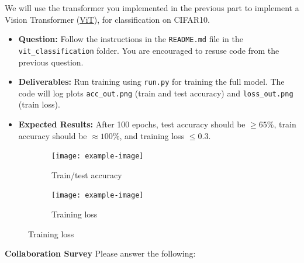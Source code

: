\documentclass[11pt,addpoints,answers]{exam}
\numberwithin{equation}{section} %
\numberwithin{figure}{section} %
\numberwithin{table}{section} %
\begin{document}
We will use the transformer you implemented in the previous part to implement a Vision Transformer (\href{https://arxiv.org/abs/2010.11929}{ViT}), for classification on CIFAR10. 

\begin{itemize}
    \item \textbf{Question:} Follow the instructions in the \texttt{README.md} file in the \texttt{vit\_classification} folder. You are encouraged to resuse code from the previous question. 
    \item \textbf{Deliverables:} Run training using \texttt{run.py} for training the full model. The code will log plots \texttt{acc\_out.png} (train and test accuracy) and \texttt{loss\_out.png} (train loss). 
    \item \textbf{Expected Results:} After 100 epochs, test accuracy should be $\geq 65\%$, train accuracy should be $\approx 100\%$, and training loss $\leq 0.3$. 
\end{itemize}

\begin{figure}[H]
    \centering
    \begin{subfigure}[b]{0.32\linewidth}
        \texttt{[image: example-image]}
        \caption{Train/test accuracy}
    \end{subfigure}
    \begin{subfigure}[b]{0.32\linewidth}
        \texttt{[image: example-image]}
        \caption{Training loss}
    \end{subfigure}
\end{figure}

\clearpage

\textbf{Collaboration Survey} Please answer the following:
\end{document}

